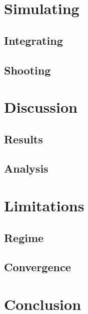 \documentclass[12pt, letterpaper]{article}
\begin{document}
    \section{Simulating}\label{sec:simulating}
        
        \subsection{Integrating}\label{subsec:integrating}
        
        \subsection{Shooting}\label{subsec:shooting}
        
    \section{Discussion}\label{sec:discussion}
        
        \subsection{Results}\label{subsec:results}
        
        \subsection{Analysis}\label{subsec:analysis}
        
    \section{Limitations}\label{sec:limitations}
        
        \subsection{Regime}\label{subsec:regime}
        
        \subsection{Convergence}\label{subsec:convergence}
    
    \section{Conclusion}\label{sec:conclusion}
        
        \newpage
    
    \printbibliography
\end{document}
